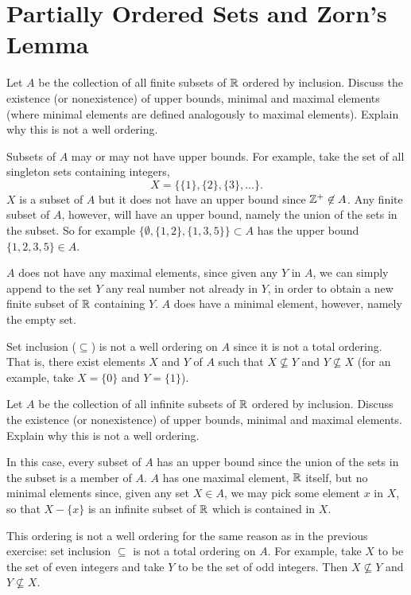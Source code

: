 \section{Partially Ordered Sets and Zorn's Lemma}

 Let $A$ be the collection of all finite subsets of $\mathbb{R}$
ordered by inclusion. Discuss the existence (or nonexistence) of upper
bounds, minimal and maximal elements (where minimal elements are
defined analogously to maximal elements). Explain why this is not a
well ordering.
\begin{solution}
  Subsets of $A$ may or may not have upper bounds. For example, take
  the set of all singleton sets containing integers,
  \begin{equation*}
    X = \{\{1\}, \{2\}, \{3\}, \dots\}.
  \end{equation*}
  $X$ is a subset of $A$ but it does not have an upper bound since
  $\mathbb{Z}^+\not\in A$. Any finite subset of $A$, however, will have an
  upper bound, namely the union of the sets in the subset. So for
  example $\{\emptyset, \{1,2\}, \{1,3,5\}\}\subset A$ has the upper
  bound $\{1,2,3,5\}\in A$.

  $A$ does not have any maximal elements, since given any $Y$ in $A$,
  we can simply append to the set $Y$ any real number not already in
  $Y$, in order to obtain a new finite subset of $\mathbb{R}$ containing
  $Y$. $A$ does have a minimal element, however, namely the empty set.

  Set inclusion ($\subseteq$) is not a well ordering on $A$ since it
  is not a total ordering. That is, there exist elements $X$ and $Y$
  of $A$ such that $X\not\subseteq Y$ and $Y\not\subseteq X$ (for an
  example, take $X = \{0\}$ and $Y = \{1\}$).
\end{solution}

 Let $A$ be the collection of all infinite subsets of $\mathbb{R}$
ordered by inclusion. Discuss the existence (or nonexistence) of upper
bounds, minimal and maximal elements. Explain why this is not a well
ordering.
\begin{solution}
  In this case, every subset of $A$ has an upper bound since the union
  of the sets in the subset is a member of $A$. $A$ has one maximal
  element, $\mathbb{R}$ itself, but no minimal elements since, given any set
  $X\in A$, we may pick some element $x$ in $X$, so that $X - \{x\}$
  is an infinite subset of $\mathbb{R}$ which is contained in $X$.

  This ordering is not a well ordering for the same reason as in the
  previous exercise: set inclusion $\subseteq$ is not a total ordering
  on $A$. For example, take $X$ to be the set of even integers and
  take $Y$ to be the set of odd integers. Then $X\not\subseteq Y$ and
  $Y\not\subseteq X$.
\end{solution}
